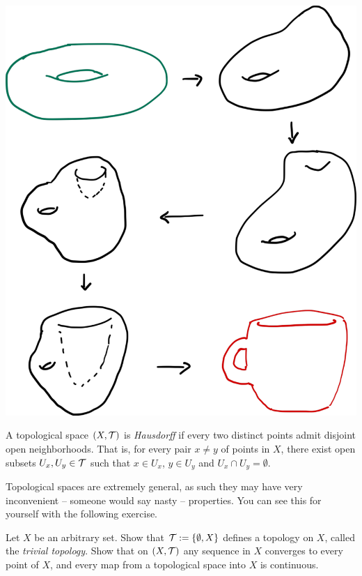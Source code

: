 \begin{marginfigure}
  \includegraphics{images/1_1-dount-to-cup.pdf}
  \vspace{5pt}
\end{marginfigure}

\begin{defn}
  A topological space $(X, \mathcal{T})$ is \emph{Hausdorff} if every two distinct points admit disjoint open neighborhoods. That is, for every pair $x\neq y$ of points in $X$, there exist open subsets $U_x, U_y\in\mathcal{T}$ such that $x\in U_x$, $y\in U_y$ and $U_x \cap U_y = \emptyset$.
\end{defn}

Topological spaces are extremely general, as such they may have very inconvenient -- someone would say nasty -- properties.
You can see this for yourself with the following exercise.

\begin{exe}
Let $X$ be an arbitrary set. Show that $\mathcal{T}:=\{\emptyset, X\}$ defines a topology on $X$, called the \emph{trivial topology}. Show that on $(X, \mathcal{T})$ any sequence in $X$ converges to every point of $X$, and every map from a topological space into $X$ is continuous.
\end{exe}

